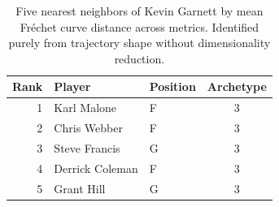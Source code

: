 \begin{table}[htbp]
  \centering\small
  \begin{tabular}{rllc}
    \toprule
    Rank & Player & Position & Archetype \\
    \midrule
    1 & Karl Malone & F & 3 \\
    2 & Chris Webber & F & 3 \\
    3 & Steve Francis & G & 3 \\
    4 & Derrick Coleman & F & 3 \\
    5 & Grant Hill & G & 3 \\
    \bottomrule
  \end{tabular}
  \caption{Five nearest neighbors of Kevin Garnett by mean Fr\'{e}chet curve distance across metrics. Identified purely from trajectory shape without dimensionality reduction.}
  \label{tab:Kevin_Garnett_frechet_curve_neighbors}
\end{table}

